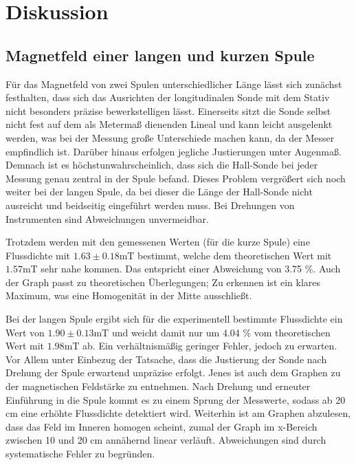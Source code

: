 \section{Diskussion}
\label{sec:Diskussion}

\subsection{Magnetfeld einer langen und kurzen Spule}
Für das Magnetfeld von zwei Spulen unterschiedlicher Länge lässt sich zunächst 
festhalten, dass sich das Ausrichten der longitudinalen Sonde mit dem Stativ
nicht besonders präzise bewerkstelligen lässt. Einerseits sitzt die Sonde selbst 
nicht fest auf dem als Metermaß dienenden Lineal und kann leicht ausgelenkt werden, 
was bei der Messung große Unterschiede machen kann, da der Messer empfindlich ist.
Darüber hinaus erfolgen jegliche Justierungen unter Augenmaß. Demnach ist es 
höchstunwahrscheinlich, dass sich die Hall-Sonde bei jeder Messung genau 
zentral in der Spule befand. Dieses Problem vergrößert sich noch weiter bei der 
langen Spule, da bei dieser die Länge der Hall-Sonde nicht ausreicht und beidseitig 
eingeführt werden muss. Bei Drehungen von Instrumenten sind Abweichungen unvermeidbar.
\par\vspace{0.5em}
Trotzdem werden mit den gemessenen Werten (für die 
kurze Spule) eine Flussdichte mit $1.63 \pm 0.18 \unit{\milli\tesla}$ bestimmt,
welche dem theoretischen Wert mit $1.57 \unit{\milli\tesla}$ sehr nahe kommen.
Das entspricht einer Abweichung von 3.75 \%.
Auch der Graph passt zu theoretischen Überlegungen; Zu erkennen ist ein klares 
Maximum, was eine Homogenität in der Mitte ausschließt.
\par\vspace{0.5em}
Bei der langen Spule ergibt sich für die experimentell bestimmte Flussdichte 
ein Wert von $1.90 \pm 0.13 \unit{\milli\tesla}$ und weicht damit nur um 4.04 \%
vom theoretischen Wert mit $1.98 \unit{\milli\tesla}$ ab. Ein verhältnismäßig 
geringer Fehler, jedoch zu erwarten. Vor Allem unter Einbezug der Tatsache, dass 
die Justierung der Sonde nach Drehung der Spule erwartend unpräzise erfolgt. 
Jenes ist auch dem Graphen zu der magnetischen Feldstärke zu entnehmen. Nach 
Drehung und erneuter Einführung in die Spule kommt es zu einem Sprung der 
Messwerte, sodass ab 20 cm eine erhöhte Flussdichte detektiert wird. Weiterhin 
ist am Graphen abzulesen, dass das Feld im Inneren homogen scheint, zumal der 
Graph im x-Bereich zwischen 10 und 20 cm annähernd linear verläuft. Abweichungen 
sind durch systematische Fehler zu begründen.

